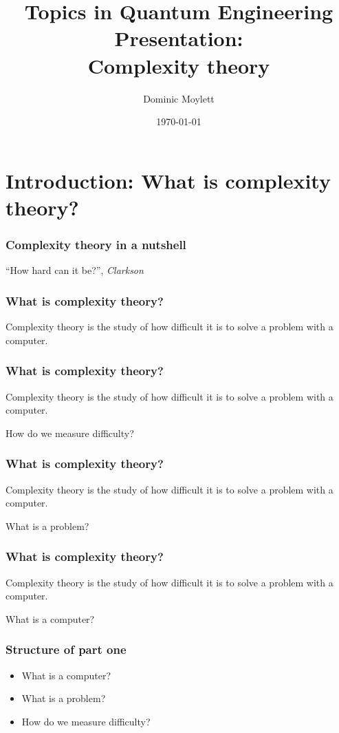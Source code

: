 \documentclass[aspectratio=169]{beamer}
\title[Complexity theory]{Topics in Quantum Engineering Presentation:\\Complexity theory} %
\author{Dominic Moylett} %
\institute[University of Bristol] %
{
University of Bristol \\ %
\medskip
\textit{dominic.moylett@bristol.ac.uk} %
}
\date{\today} %
\begin{document}
\begin{frame}
\titlepage %
\end{frame}


\section{Introduction: What is complexity theory?}

\begin{frame}
\frametitle{Complexity theory in a nutshell}
\centerline{``How hard can it be?'', {\em Clarkson}}
\end{frame}

\begin{frame}
\frametitle{What is complexity theory?}
Complexity theory is the study of how difficult it is to solve a problem with a computer.
\end{frame}

\begin{frame}
\frametitle{What is complexity theory?}
Complexity theory is the study of how {\color{red} difficult} it is to solve a problem with a computer.

How do we measure difficulty?
\end{frame}

\begin{frame}
\frametitle{What is complexity theory?}
Complexity theory is the study of how difficult it is to solve a {\color{red} problem} with a computer.

What is a problem?
\end{frame}

\begin{frame}
\frametitle{What is complexity theory?}
Complexity theory is the study of how difficult it is to solve a problem with a {\color{red} computer}.

What is a computer?
\end{frame}

\begin{frame}
\frametitle{Structure of part one}
\begin{itemize}
    \item What is a computer?
    \item What is a problem?
    \item How do we measure difficulty?
\end{itemize}
\end{frame}
\end{document}
